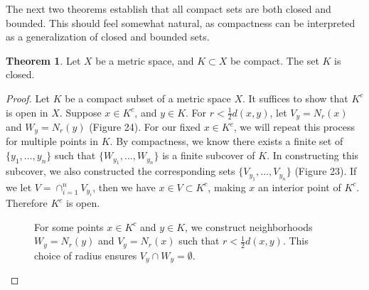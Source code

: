 \documentclass{article}
\theoremstyle{definition}
\newtheorem{theorem}{Theorem}[section]
\begin{document}
The next two theorems establish that all compact sets are both closed and bounded. This should feel somewhat natural, as compactness can be interpreted as a generalization of closed and bounded sets.
\begin{theorem}
	Let $ X $ be a metric space, and $ K\subset X $ be compact. The set $ K $ is closed. 
\end{theorem} 
\begin{proof}
Let $ K $ be a compact subset of a metric space $ X $. It suffices to show that $ K^c $ is open in $ X $. Suppose $ x\in K^c $, and $ y\in K $. For $ r<\frac{1}{2}d(x,y) $, let $ V_y=N_r(x) $ and $ W_y=N_r(y) $ (Figure 24). For our fixed $ x\in K^c $, we will repeat this process for multiple points in $ K $. By compactness, we know there exists a finite set of $ \{y_1,\ldots,y_n\} $ such that $ \{W_{y_1},\ldots,W_{y_n}\} $ is a finite subcover of $ K $. In constructing this subcover, we also constructed the corresponding sets $ \{V_{y_1},\ldots, V_{y_n}\} $ (Figure 23). If we let $ V=\cap_{i=1}^n V_{y_i} $, then we have $ x\in V\subset K^c $, making $ x $ an interior point of $ K^c $. Therefore $ K^c $ is open.
 \begin{figure}[h!]
	\centering
	\caption{For some points $ x\in K^c $ and $ y\in K $, we construct neighborhoods $ W_y=N_r(y)$ and $ V_y=N_r(x) $ such that $ r<\frac{1}{2}d(x,y) $. This choice of radius ensures $ V_y\cap W_y=\emptyset $.}  
\end{figure}
 \begin{figure}[h!]
	\centering
\end{figure}
\end{proof}
\end{document}
